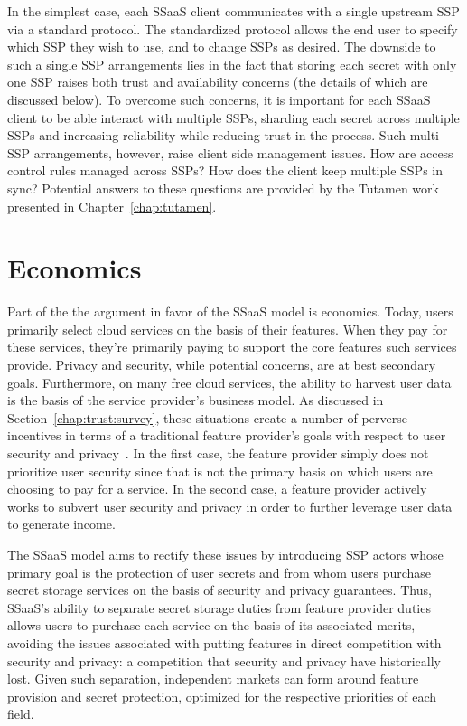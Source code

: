In the simplest case, each SSaaS client communicates with a single
upstream SSP via a standard protocol. The standardized protocol allows
the end user to specify which SSP they wish to use, and to change SSPs
as desired. The downside to such a single SSP arrangements lies in the
fact that storing each secret with only one SSP raises both trust and
availability concerns (the details of which are discussed below). To
overcome such concerns, it is important for each SSaaS client to be
able interact with multiple SSPs, sharding each secret across multiple
SSPs and increasing reliability while reducing trust in the
process. Such multi-SSP arrangements, however, raise client side
management issues. How are access control rules managed across SSPs?
How does the client keep multiple SSPs in sync? Potential answers to
these questions are provided by the Tutamen work presented in
Chapter~\ref{chap:tutamen}.

\section{Economics}
\label{chap:ssaas:economics}

Part of the the argument in favor of the SSaaS model is
economics. Today, users primarily select cloud services on the basis
of their features. When they pay for these services, they're primarily
paying to support the core features such services provide. Privacy and
security, while potential concerns, are at best secondary
goals. Furthermore, on many free cloud services, the ability to
harvest user data is the basis of the service provider's business
model. As discussed in Section~\ref{chap:trust:survey}, these
situations create a number of perverse incentives in terms of a
traditional feature provider's goals with respect to user security and
privacy~\cite{anderson2001}. In the first case, the feature provider
simply does not prioritize user security since that is not the primary
basis on which users are choosing to pay for a service. In the second
case, a feature provider actively works to subvert user security and
privacy in order to further leverage user data to generate income.

The SSaaS model aims to rectify these issues by introducing SSP actors
whose primary goal is the protection of user secrets and from whom
users purchase secret storage services on the basis of security and
privacy guarantees. Thus, SSaaS's ability to separate secret storage
duties from feature provider duties allows users to purchase each
service on the basis of its associated merits, avoiding the issues
associated with putting features in direct competition with security
and privacy: a competition that security and privacy have historically
lost. Given such separation, independent markets can form around
feature provision and secret protection, optimized for the respective
priorities of each field.

